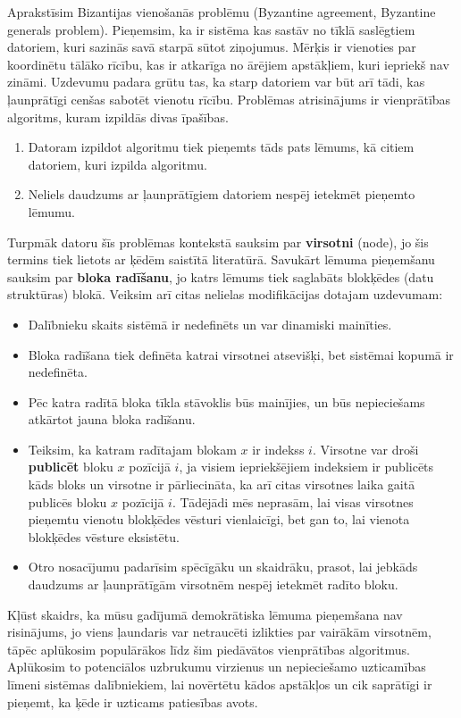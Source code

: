 Aprakstīsim Bizantijas vienošanās problēmu (Byzantine agreement, Byzantine generals problem).
Pieņemsim, ka ir sistēma kas sastāv no tīklā saslēgtiem datoriem, kuri sazinās savā starpā sūtot ziņojumus. Mērķis ir vienoties par koordinētu tālāko rīcību, kas ir atkarīga no ārējiem apstākļiem, kuri iepriekš nav zināmi. Uzdevumu padara grūtu tas, ka starp datoriem var būt arī tādi, kas ļaunprātīgi cenšas sabotēt vienotu rīcību.
Problēmas atrisinājums ir vienprātības algoritms, kuram izpildās divas īpašības.
\begin{enumerate}
    \item Datoram izpildot algoritmu tiek pieņemts tāds pats lēmums, kā citiem datoriem, kuri izpilda algoritmu.
    \item Neliels daudzums ar ļaunprātīgiem datoriem nespēj ietekmēt pieņemto lēmumu.
\end{enumerate}\cite{lamport82}
Turpmāk datoru šīs problēmas kontekstā sauksim par \textbf{virsotni} (node), jo šis termins tiek lietots ar ķēdēm saistītā literatūrā. Savukārt lēmuma pieņemšanu sauksim par \textbf{bloka radīšanu}, jo katrs lēmums tiek saglabāts blokķēdes (datu struktūras) blokā. Veiksim arī citas nelielas modifikācijas dotajam uzdevumam:
\begin{itemize}
    \item Dalībnieku skaits sistēmā ir nedefinēts un var dinamiski mainīties.
    \item Bloka radīšana tiek definēta katrai virsotnei atsevišķi, bet sistēmai kopumā ir nedefinēta.
    \item Pēc katra radītā bloka tīkla stāvoklis būs mainījies, un būs nepieciešams atkārtot jauna bloka radīšanu. 
    \item Teiksim, ka katram radītajam blokam $x$ ir indekss $i$. Virsotne var droši \textbf{publicēt} bloku $x$ pozīcijā $i$, ja visiem iepriekšējiem indeksiem ir publicēts kāds bloks un virsotne ir pārliecināta, ka arī citas virsotnes laika gaitā publicēs bloku $x$ pozīcijā $i$.\cite{mazieres15} Tādējādi mēs neprasām, lai visas virsotnes pieņemtu vienotu blokķēdes vēsturi vienlaicīgi, bet gan to, lai vienota blokķēdes vēsture eksistētu. 
    \item Otro nosacījumu padarīsim spēcīgāku un skaidrāku, prasot, lai jebkāds daudzums ar ļaunprātīgām virsotnēm nespēj ietekmēt radīto bloku.
\end{itemize}
Kļūst skaidrs, ka mūsu gadījumā demokrātiska lēmuma pieņemšana nav risinājums, jo viens ļaundaris var netraucēti izlikties par vairākām virsotnēm, tāpēc aplūkosim populārākos līdz šim piedāvātos vienprātības algoritmus. Aplūkosim to potenciālos uzbrukumu virzienus un nepieciešamo uzticamības līmeni sistēmas dalībniekiem, lai novērtētu kādos apstākļos un cik saprātīgi ir pieņemt, ka ķēde ir uzticams patiesības avots.


